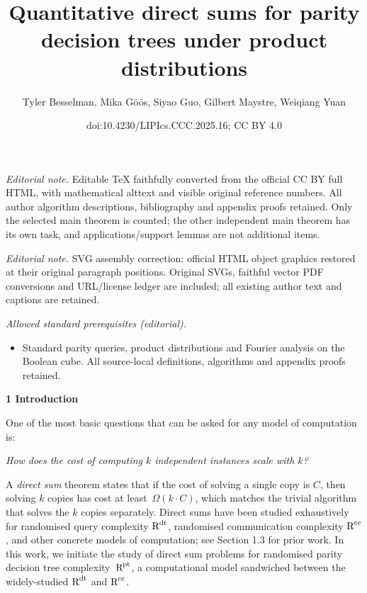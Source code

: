 \documentclass[10pt,a4paper]{article}
\title{Quantitative direct sums for parity decision trees under product distributions}
\author{Tyler Besselman, Mika Göös, Siyao Guo, Gilbert Maystre, Weiqiang Yuan}
\date{doi:10.4230/LIPIcs.CCC.2025.16; CC BY 4.0}
\begin{document}
\maketitle
\noindent\textit{Editorial note.} Editable TeX faithfully converted from the official CC BY full HTML, with mathematical alttext and visible original reference numbers. All author algorithm descriptions, bibliography and appendix proofs retained. Only the selected main theorem is counted; the other independent main theorem has its own task, and applications/support lemmas are not additional items.\par\medskip
\noindent\textit{Editorial note.} SVG assembly correction: official HTML object graphics restored at their original paragraph positions. Original SVGs, faithful vector PDF conversions and URL/license ledger are included; all existing author text and captions are retained.\par\medskip
\noindent\textit{Allowed standard prerequisites (editorial).}\begin{itemize}
\item Standard parity queries, product distributions and Fourier analysis on the Boolean cube. All source-local definitions, algorithms and appendix proofs retained.
\end{itemize}\medskip


\par\medskip\noindent\textbf{
1 Introduction}\par




One of the most basic questions that can be asked for any model of computation is:\par


\emph{How does the cost of computing $k$ independent instances scale with $k$?}\par


A \emph{direct sum} theorem states that if the cost of solving a single copy is $C$, then solving $k$ copies has cost at least $\Omega(k\cdot C)$, which matches the trivial algorithm that solves the $k$ copies separately. Direct sums have been studied exhaustively for randomised query complexity ${\textup{R}}^{\textup{dt}}$, randomised communication complexity ${\textup{R}}^{\textup{cc}}$, and other concrete models of computation; see Section 1.3 for prior work. In this work, we initiate the study of direct sum problems for randomised parity decision tree complexity ${\textup{R}}^{\textup{pt}}$, a computational model sandwiched between the widely-studied ${\textup{R}}^{\textup{dt}}$ and ${\textup{R}}^{\textup{cc}}$.\par
\end{document}
